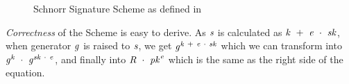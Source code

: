 \begin{figure}
    \begin{center}
        \fbox{
            \begin{varwidth}{\textwidth}
                \procedure[linenumbering, syntaxhighlight=auto]{$\procSetup{\varSecParam}$} {
                    \varKey \sample \cnstIntegersPrimeWithoutZero{\varPrime} \\
                    \pcreturn (\varSecKey \opAssign \varKey \opSeperate \varPubKey \opAssign \funGen{\varKey})
                }
                \procedure[linenumbering, syntaxhighlight=auto]{$\procSign{\varMsg}{\varSecKey}$}{
                    \varNonce \sample \cnstIntegersPrimeWithoutZero{\varPrime} \\
                    \varRand \opAssign \funGen{\varNonce} \\
                    \varSchnorrChallenge \opAssign \funHash{\varMsg \opConc \varRand \opConc \varPubKey} \\
                    \varS \opAssign \varNonce \opAddScalar \varSchnorrChallenge \opTimesScalar \varSecKey \\
                    \pcreturn \varSignature \opAssign (\varS, \varRand)
                }
                \procedure[linenumbering, syntaxhighlight=auto]{$\procVerf{\varMsg}{\varSignature}{\varPubKey}$} {
                    \varS \opAssign \opAccess{\varSignature}{\varS} \\
                    \varRand \opAssign \opAccess{\varSignature}{\varRand} \\
                    \varSchnorrChallenge \opAssign \funHash{\varMsg \opConc \varRand \opConc \varPubKey} \\
                    \pcreturn \funGen{\varS} \opEq \opPointScalar{\varRand}{\varSchnorrChallenge} \opAddPoint \varPubKey
                }
            \end{varwidth}
        }
    \end{center}
    \caption{Schnorr Signature Scheme as defined in~\cite{schnorr1989efficient}}
    \label{fig:schnorr}
\end{figure}
\textit{Correctness} of the Scheme is easy to derive. As $\mathit{s}$ is calculated as $\mathit{k} ~+~ \mathit{e} ~\cdot~ \mathit{sk}$, when generator $\mathit{g}$ is raised to $\mathit{s}$, we get
$\mathit{g}^{\mathit{k} ~+~ \mathit{e} ~\cdot~ \mathit{sk}}$ which we can transform into $\mathit{g}^{\mathit{k}} ~\cdot~ \mathit{g}^{\mathit{sk} ~\cdot~ \mathit{e}}$, and finally
into $\mathit{R} ~\cdot~ \mathit{pk}^{\mathit{e}}$ which is the same as the right side of the equation. \\

